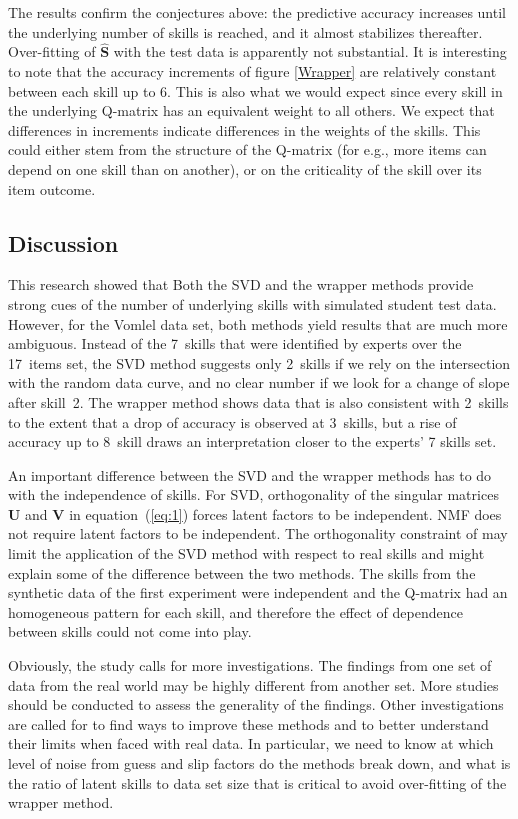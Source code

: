 The results confirm the conjectures above: the predictive accuracy increases until the underlying number of skills is reached, and it almost stabilizes thereafter. Over-fitting of $\hat{\mathbf{S}}$ with the test data is apparently not substantial. It is interesting to note that the accuracy increments of figure \ref{Wrapper} are relatively constant between each skill up to 6. This is also what we would expect since every skill in the underlying Q-matrix has an equivalent weight to all others. We expect that differences in increments indicate differences in the weights of the skills. This could either stem from the structure of the Q-matrix (for e.g., more items can depend on one skill than on another), or on the criticality of the skill over its item outcome.



\subsection{Discussion}
This research showed that Both the SVD and the wrapper methods provide strong cues of the number of underlying skills with simulated student test data.  However, for the Vomlel data set, both methods yield results that are much more ambiguous.  Instead of the 7~skills that were identified by experts over the 17~items set, the SVD method suggests only 2~skills if we rely on the intersection with the random data curve, and no clear number if we look for a change of slope after skill~2.  The wrapper method shows data that is also consistent with 2~skills to the extent that a drop of accuracy is observed at 3~skills, but a rise of accuracy up to 8~skill draws an interpretation closer to the experts' 7 skills set.

An important difference between the SVD and the wrapper methods has to do with the independence of skills.  For SVD, orthogonality of the singular matrices $\mathbf{U}$ and $\mathbf{V}$ in equation~(\ref{eq:1}) forces latent factors to be independent.  NMF does not require latent factors to be independent.  The orthogonality constraint of may limit the application of the SVD method with respect to real skills and might explain some of the difference between the two methods.  The skills from the synthetic data of the first experiment were independent and the Q-matrix had an homogeneous pattern for each skill, and therefore the effect of dependence between skills could not come into play.

Obviously, the study calls for more investigations.  The findings from one set of data from the real world may be highly different from another set. More studies should be conducted to assess the generality of the findings.  Other investigations are called for to find ways to improve these methods and to better understand their limits when faced with real data.  In particular, we need to know at which level of noise from guess and slip factors do the methods break down, and what is the ratio of latent skills to data set size that is critical to avoid over-fitting of the wrapper method.

